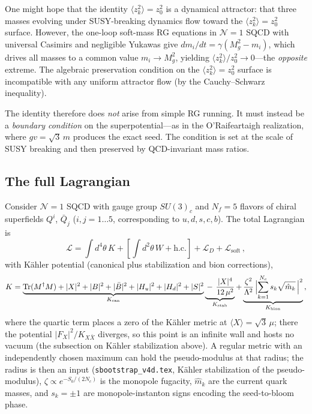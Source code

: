 \documentclass[12pt,a4paper]{article}
\begin{document}
One might hope that the identity
$\langle z_k^2\rangle = z_0^2$ is a dynamical attractor:
that three masses evolving under SUSY-breaking dynamics flow toward
the $\langle z_k^2\rangle = z_0^2$ surface. However, the one-loop soft-mass RG
equations in $\mathcal{N}=1$ SQCD with universal Casimirs and
negligible Yukawas give $dm_i/dt = \gamma(M_g^2 - m_i)$, which
drives all masses to a common value $m_i \to M_g^2$, yielding
$\langle z_k^2\rangle/z_0^2 \to 0$---the \emph{opposite} extreme.
The algebraic preservation condition on the
$\langle z_k^2\rangle = z_0^2$ surface is incompatible with any
uniform attractor flow (by the Cauchy--Schwarz inequality).

The identity therefore does \emph{not} arise from simple RG running.
It must instead be a \emph{boundary condition} on the
superpotential---as in the O'Raifeartaigh realization, where
$gv = \sqrt{3}\,m$ produces the exact seed. The condition is set at
the scale of SUSY breaking and then preserved by QCD-invariant mass
ratios.

\subsection{The full Lagrangian}

Consider $\mathcal{N}=1$ SQCD with gauge group $SU(3)_c$ and $N_f=5$ flavors
of chiral superfields $Q^i$, $\bar Q_j$ ($i,j=1\ldots 5$, corresponding to
$u,d,s,c,b$). The total Lagrangian is
\begin{equation}
  \mathcal{L}
  = \int\!d^4\theta\,K
  + \left[\int\!d^2\theta\,W + \text{h.c.}\right]
  + \mathcal{L}_D
  + \mathcal{L}_{\text{soft}}\,,
\end{equation}
with K\"ahler potential (canonical plus stabilization and bion corrections),
\begin{equation}
  K = \underbrace{\operatorname{Tr}(M^\dagger M) + |X|^2 + |B|^2
    + |\bar B|^2 + |H_u|^2 + |H_d|^2 + |S|^2}_{K_{\text{can}}}
  \underbrace{{}-\,\frac{|X|^4}{12\,\mu^2}}_{K_{\text{stab}}}
  + \underbrace{\frac{\zeta^2}{\Lambda^2}\,
    \Bigl|\sum_{k=1}^{N_c} s_k \sqrt{\hat m_k}\,\Bigr|^2}_{K_{\text{bion}}}\,,
\end{equation}
where the quartic term places a zero of the K\"ahler metric at
$\langle X\rangle = \sqrt{3}\,\mu$; there the potential
$|F_X|^2/K_{X\bar X}$ diverges, so this point is an infinite wall and
hosts no vacuum (the subsection on K\"ahler stabilization above). A
regular metric with an independently chosen maximum can hold the
pseudo-modulus at that radius; the radius is then an input
(\texttt{sbootstrap\_v4d.tex}, K\"ahler stabilization of the
pseudo-modulus),
$\zeta \propto e^{-S_0/(2N_c)}$ is the monopole fugacity,
$\hat m_k$ are the current quark masses, and
$s_k = \pm 1$ are monopole-instanton signs encoding the seed-to-bloom phase.
\end{document}
